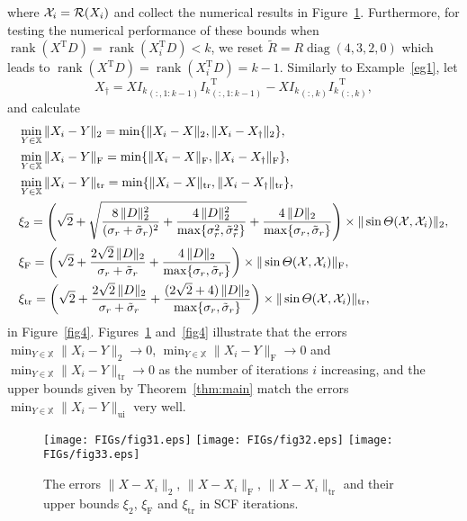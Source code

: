 \documentclass[11pt]{article}
\def\bbX{\mathbb{X}}
\def\cR{{\cal R}}
\def\cX{{\cal X}}
\DeclareMathOperator{\diag}{diag}
\DeclareMathOperator{\rank}{rank}
\DeclareMathOperator{\tr}{tr}
\DeclareMathOperator{\F}{F}
\DeclareMathOperator{\T}{T}
\DeclareMathOperator{\UI}{ui}
\def\wtd{\widetilde}
\theoremstyle{definition}
\numberwithin{equation}{section}
\numberwithin{figure}{section}
\numberwithin{table}{section}
\begin{document}
where $\cX_i=\cR(X_i)$ and collect the numerical results in Figure~\ref{fig3}. Furthermore, for testing
the numerical performance of these bounds when $\rank(X^{\T}D)=\rank(X_i^{\T}D)<k$, we reset
$\wtd R=R\diag(4,3,2,0)$ which leads to $\rank(X^{\T}D)=\rank(X_i^{\T}D)=k-1$. Similarly to Example~\ref{eg1}, let
\[X_{\dagger}=X{I_k}_{(:,1:k-1)}{I_k}_{(:,1:k-1)}^{\T}-X{I_k}_{(:,k)}{I_k}_{(:,k)}^{\T},\]
and calculate
\begin{align*}
    &\min_{Y\in\bbX}\|X_i-Y\|_2=\min\{\|X_i-X\|_2, \|X_i-X_{\dagger}\|_2\},\\
&\min_{Y\in\bbX}\|X_i-Y\|_{\F}=\min\{\|X_i-X\|_{\F}, \|X_i-X_{\dagger}\|_{\F}\},\\
&\min_{Y\in\bbX}\|X_i-Y\|_{\tr}=\min\{\|X_i-X\|_{\tr}, \|X_i-X_{\dagger}\|_{\tr}\},\\
    &\xi_2=\left(\sqrt 2+\sqrt{\dfrac{8\,\|D\|_2^2}{(\sigma_r+\tilde\sigma_r)^2}
+\dfrac{4\,\|D\|_2^2}{\max\{\sigma_r^2,\tilde\sigma_r^2\}}}+\frac{4\,\|D\|_2}{\max\{\sigma_r,\tilde\sigma_r\}}\right)
\times\|\sin\Theta(\cX,\cX_i)\|_2,\\
   &\xi_{\F}=\left(\sqrt 2+\frac{2\sqrt 2\,\|D\|_2}{\sigma_r+\tilde\sigma_r}+\frac{4\,\|D\|_2}
                {\max\{\sigma_r,\tilde\sigma_r\}}\right)\times\|\sin\Theta(\cX,\cX_i)\|_{\F},\\
   &\xi_{\tr}=\left(\sqrt 2+\frac{2\sqrt 2\,\|D\|_2}{\sigma_r+\tilde\sigma_r}+\frac{(2\sqrt{2}+4)\,\|D\|_2}
                {\max\{\sigma_r,\tilde\sigma_r\}}\right)\times\|\sin\Theta(\cX,\cX_i)\|_{\tr},
\end{align*}
in Figure~\ref{fig4}. Figures~\ref{fig3} and~\ref{fig4} illustrate that the errors $\min_{Y\in\bbX}\|X_i-Y\|_2\rightarrow 0$,
$\min_{Y\in\bbX}\|X_i-Y\|_{\F}\rightarrow 0$ and $\min_{Y\in\bbX}\|X_i-Y\|_{\tr}\rightarrow 0$
as the number of iterations $i$ increasing, and the upper bounds given by Theorem~\ref{thm:main} match the errors
$\min_{Y\in\bbX}\|X_i-Y\|_{\UI}$ very well.
\begin{figure}
\begin{center}
\texttt{[image: FIGs/fig31.eps]}
\texttt{[image: FIGs/fig32.eps]}
\texttt{[image: FIGs/fig33.eps]}
\end{center}
\vspace{-10pt}
\caption{The errors $\|X-X_i\|_2$, $\|X-X_i\|_{\F}$, $\|X-X_i\|_{\tr}$
and their upper bounds $\xi_2$, $\xi_{\F}$ and $\xi_{\tr}$ in SCF iterations.} \label{fig3}
\end{figure}
\end{document}
